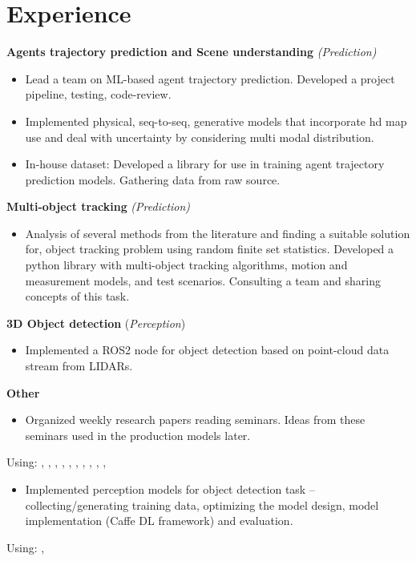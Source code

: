 \section*{\sectionformat Experience}
% 

\textbf{Agents trajectory prediction and Scene understanding} \textit{(Prediction)}
\begin{itemize}
    \item Lead a team on ML-based agent trajectory prediction. Developed a project pipeline, testing, code-review.
    \item Implemented physical, seq-to-seq, generative models that incorporate hd map use and deal with uncertainty by considering multi modal distribution.
    \item In-house dataset: Developed a library for use in training agent trajectory prediction models. Gathering data from raw source.
\end{itemize}

\textbf{Multi-object tracking} \textit{(Prediction)}
\begin{itemize}
    \item Analysis of several methods from the literature and finding a suitable solution for, object tracking problem using random finite set statistics. Developed a python library with multi-object tracking algorithms, motion and measurement models, and test scenarios. Consulting a team and sharing concepts of this task.
\end{itemize}

\textbf{3D Object detection} (\textit{Perception})
\begin{itemize}
    \item Implemented a ROS2 node for object detection based on point-cloud data stream from LIDARs.
\end{itemize}

\textbf{Other}
\begin{itemize}
    \item Organized weekly research papers reading seminars. Ideas from these seminars used in the production models later.
\end{itemize}
Using: , , , , , , , , , , 
\horizontalline
% 
\begin{itemize}
    \item Implemented perception models for object detection task -- collecting/generating training data, optimizing the model design, model implementation (Caffe DL framework) and evaluation.
\end{itemize}
Using: , 

